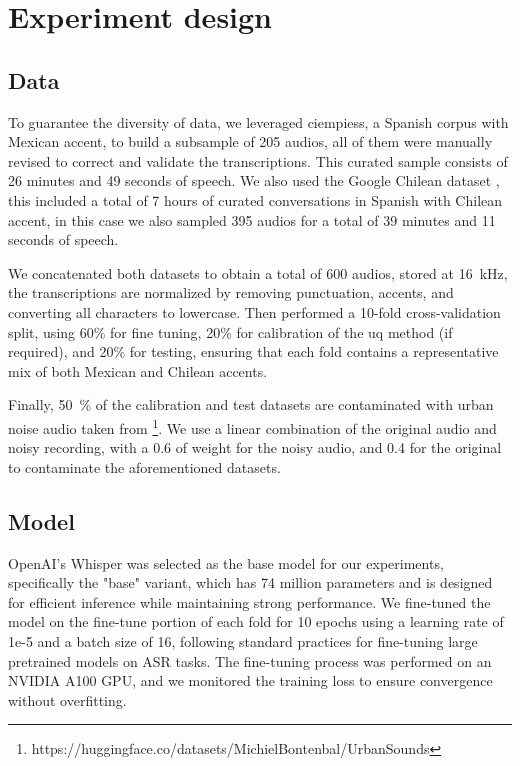 \documentclass[11pt]{article}
\begin{document}
\section{Experiment design}

\subsection{Data}

To guarantee the diversity of data, we leveraged \acrfull{ciempiess}\cite{hernandez2017automatic}, a Spanish corpus with Mexican accent, to build a subsample of 205 audios, all of them were manually revised to correct and validate the transcriptions. This curated sample consists of 26 minutes and 49 seconds of speech.
We also used the Google Chilean dataset \cite{guevara-rukoz-etal-2020-crowdsourcing}, this included a total of 7 hours of curated conversations in Spanish with Chilean accent, in this case we also sampled 395 audios for a total of 39 minutes and 11 seconds of speech. 

We concatenated both datasets to obtain a total of 600 audios, stored at \SI{16}{\kilo\hertz}, the transcriptions are normalized by removing punctuation, accents, and converting all characters to lowercase. Then performed a 10-fold cross-validation split, using 60\% for fine tuning, 20\% for calibration of the \acrshort{uq} method (if required), and 20\% for testing, ensuring that each fold contains a representative mix of both Mexican and Chilean accents. 

Finally, \SI{50}{\percent} of the calibration and test datasets are contaminated with urban noise audio taken from \footnote{https://huggingface.co/datasets/MichielBontenbal/UrbanSounds}. We use a linear combination of the original audio and noisy recording, with a 0.6 of weight for the noisy audio, and 0.4 for the original to contaminate the aforementioned datasets.

\subsection{Model}

OpenAI's Whisper \cite{radford2023robust} was selected as the base model for our experiments, specifically the "base" variant, which has 74 million parameters and is designed for efficient inference while maintaining strong performance. We fine-tuned the model on the fine-tune portion of each fold for 10 epochs using a learning rate of 1e-5 and a batch size of 16, following standard practices for fine-tuning large pretrained models on ASR tasks. The fine-tuning process was performed on an NVIDIA A100 GPU, and we monitored the training loss to ensure convergence without overfitting.
\end{document}
